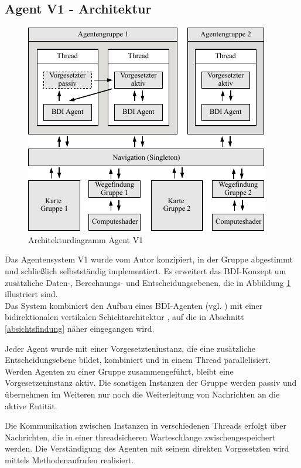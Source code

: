 \documentclass[runningheads]{llncs}
\begin{document}
\subsection{Agent V1 - Architektur}\label{agentV1}
\begin{figure}
\includegraphics{./Referenzen/Architekturdiagramm.pdf}
\caption{Architekturdiagramm Agent V1}
\label{g3:architecture}
\end{figure}
Das Agentensystem V1 wurde vom Autor konzipiert, in der Gruppe abgestimmt und schließlich selbstständig implementiert. Es erweitert das BDI-Konzept \cite{Bratman1987} um zusätzliche Daten-, Berechnungs- und Entscheidungsebenen, die in Abbildung \ref{g3:architecture} illustriert sind. \\
Das System kombiniert den Aufbau eines BDI-Agenten (vgl. \cite[S. 58]{Weiss2000}) mit einer bidirektionalen vertikalen Schichtarchitektur \cite[S. 61-62]{Weiss2000}, auf die in Abschnitt
\ref{absichtsfindung} näher eingegangen wird.

Jeder Agent wurde mit einer Vorgesetzteninstanz, die eine zusätzliche Entscheidungsebene bildet, kombiniert und in einem Thread parallelisiert. Werden Agenten zu einer Gruppe zusammengeführt, bleibt eine Vorgesetzeninstanz aktiv. Die sonstigen Instanzen der Gruppe werden passiv und übernehmen im Weiteren nur noch die Weiterleitung von Nachrichten an die aktive Entität.

Die Kommunikation zwischen Instanzen in verschiedenen Threads erfolgt über Nachrichten, die in einer threadsicheren Warteschlange zwischengespeichert werden. Die Verständigung des Agenten mit seinem direkten Vorgesetzten wird mittels Methodenaufrufen realisiert.
\end{document}
